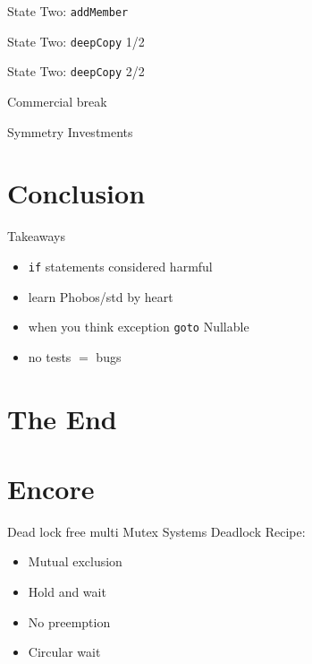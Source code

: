 \documentclass[aspectratio=169,notes]{beamer}
\begin{document}
	\begin{frame}[fragile]{State Two: \lstinline{addMember}}
		
	\end{frame}

	\begin{frame}[fragile]{State Two: \lstinline{deepCopy} 1/2}
		
	\end{frame}

	\begin{frame}[fragile]{State Two: \lstinline{deepCopy} 2/2}
		
	\end{frame}

	\begin{frame}[fragile]{Commercial break}
		\begin{center}
			{\Large Symmetry Investments}
		\end{center}
	\end{frame}

	\section{Conclusion}
	\begin{frame}[fragile]{Takeaways}
		\begin{itemize}
			\item \lstinline{if} statements considered harmful
			\item learn Phobos/std by heart
			\item when you think exception \lstinline{goto} Nullable
			\item no tests $=$ bugs
		\end{itemize}
	\end{frame}

	\section{The End}

	\section{Encore}

	\begin{frame}[fragile]{Dead lock free multi Mutex Systems}
		Deadlock Recipe:\\
		\begin{itemize}
			\item Mutual exclusion
			\item Hold and wait
			\item No preemption
			\item Circular wait
		\end{itemize}
	\end{frame}
\end{document}

